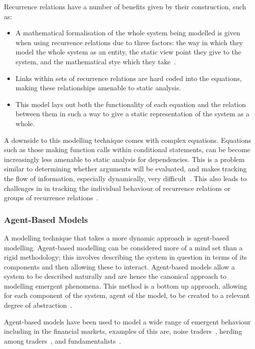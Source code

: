 \documentclass{article}
\begin{document}
Recurrence relations have a number of benefits given by their construction, such as:
\begin{itemize}
    \item A mathematical formalisation of the whole system being modelled is given when using recurrence relations due to three factors: the way in which they model the whole system as an entity, the static view point they give to the system, and the mathematical stye which they take~\cite{rrformulism}.
    \item Links within sets of recurrence relations are hard coded into the equations, making these relationships amenable to static analysis.  
    \item This model lays out both the functionality of each equation and the relation between them in such a way to give a static representation of the system as a whole. 
\end{itemize}

A downside to this modelling technique comes with complex equations. Equations such as those making function calls within conditional statements, can be become increasingly less amenable to static analysis for dependencies. This is a problem similar to determining whether arguments will be evaluated, and makes tracking the flow of information, especially dynamically, very difficult~\cite{willevaluteargsa}. This also leads to challenges in in tracking the individual behaviour of recurrence relations or groups of recurrence relations~\cite{rrbtrack}.         







\subsubsection{Agent-Based Models}
A modelling technique that takes a more dynamic approach is agent-based modelling. Agent-based modelling can be considered more of a mind set than a rigid methodology; this involves describing the system in question in terms of its components and then allowing these to interact. Agent-based models allow a system to be described naturally and are hence the canonical approach to modelling emergent phenomena. This method is a bottom up approach, allowing for each component of the system, agent of the model, to be created to a relevant degree of abstraction~\cite{abmhumsystems}.

Agent-based models have been used to model a wide range of emergent behaviour including in the financial markets, examples of this are, noise traders~\cite{abmnoisetraders}, herding among traders~\cite{abmherding}, and fundamentalists~\cite{abmfundemetilists}.
\end{document}
